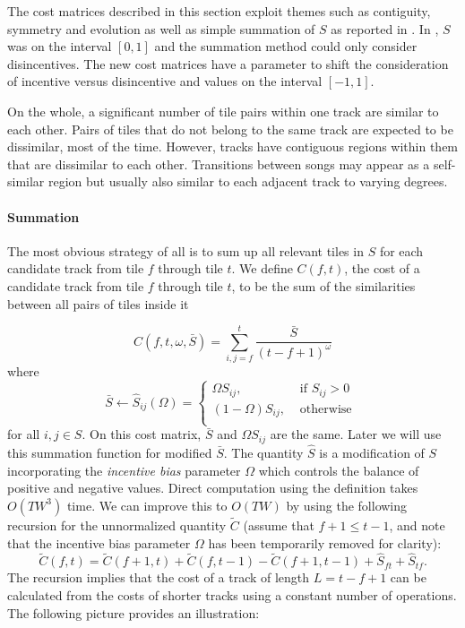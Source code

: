 \documentclass[twocolumn]{article}
\begin{document}
	The cost matrices described in this section exploit themes such as contiguity, symmetry and evolution as well as simple summation of $S$ as reported in \citep{scarfe2013long}. In \citep{scarfe2013long}, $S$ was on the interval $[0,1]$ and the summation method could only consider disincentives. The new cost matrices have a parameter to shift the consideration of incentive versus disincentive and values on the interval $[-1,1]$.
	
	On the whole, a significant number of tile pairs within one track are similar to each other. Pairs of tiles that do not belong to the same track are expected to be dissimilar, most of the time. However, tracks have contiguous regions within them that are dissimilar to each other. Transitions between songs may appear as a self-similar region but usually also similar to each adjacent track to varying degrees.  
	
	\paragraph{Summation}\label{sec:summation}
	
	The most obvious strategy of all is to sum up all relevant tiles in $S$ for each candidate track from tile $f$ through tile $t$. We define $C(f,t)$, the cost of a candidate track from tile $f$ through tile $t$, to be the sum of the similarities between all pairs of tiles inside it

	\begin{dmath*}
	C(f,t, \omega, \bar S) =	\sum_{i,j=f}^{t} \frac{ \bar S }{ ( t - f + 1)^\omega }
	\end{dmath*}
where
	\begin{dmath*}
		\bar S \gets \hat S_{ij}(\Omega)=	{ \left\{
			\begin{array}{ll}
				 \Omega {S}_{ij},  & \text{~if~}{S}_{ij} > 0   \\
				 \left( 1-\Omega \right) {S}_{ij}, & \mbox{~otherwise~}\\
			\end{array}
			\right.} 
	\end{dmath*} 
for all $i,j \in {S}$. On this cost matrix, $\bar S$ and $\Omega {S}_{ij}$ are the same. Later we will use this summation function for modified $\bar S$. The quantity $\hat S$ is a modification of $S$ incorporating the \textit{incentive bias} parameter $\Omega$ which controls the balance of
positive and negative values. Direct computation using the definition
takes $O(TW^3)$ time. We can improve this to
$O(TW)$ by using the following recursion for the unnormalized quantity $\tilde C$ (assume that $f+1 \le t-1$, and note that the incentive bias parameter $\Omega$ has been temporarily removed for clarity):
	\begin{dmath*}
		\tilde C(f,t) = \tilde C(f+1,t) + \tilde C(f,t-1) - \tilde C(f+1,t-1) + \hat S_{ft} + \hat S_{tf}.
	\end{dmath*} 
The recursion implies that the cost of a track of length $L=t-f+1$ can
be calculated from the costs of shorter tracks using a constant number
of operations. The following picture provides an
illustration:
	
\end{document}
